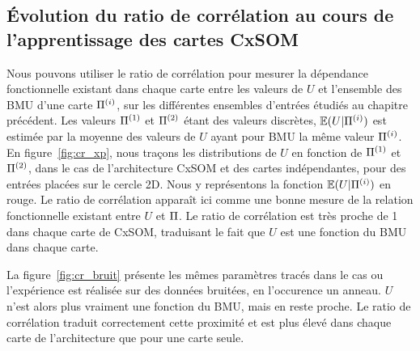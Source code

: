 \documentclass[../main]{subfiles}
\begin{document}
\subsection{\'Evolution du ratio de corrélation au cours de l'apprentissage des cartes CxSOM}

Nous pouvons utiliser le ratio de corrélation pour mesurer la dépendance fonctionnelle existant dans chaque carte entre les valeurs de $U$ et l'ensemble des BMU d'une carte $\Pi^{({i})}$, sur les différentes ensembles d'entrées étudiés au chapitre précédent.
Les valeurs $\Pi^{({1})}$ et $\Pi^{({2})}$ étant des valeurs discrètes, $\mathbb{E}(U|\Pi^{({i})})$ est estimée par la moyenne des valeurs de $U$ ayant pour BMU la même valeur $\Pi^{({i})}$. 
En figure~\ref{fig:cr_xp}, nous traçons les distributions de $U$ en fonction de $\Pi^{({1})}$ et $\Pi^{({2})}$, dans le cas de l'architecture CxSOM et des cartes indépendantes, pour des entrées placées sur le cercle 2D. Nous y représentons la fonction $\mathbb{E}(U|\Pi^{({i})})$ en rouge.
Le ratio de corrélation apparaît ici comme une bonne mesure de la relation fonctionnelle existant entre $U$ et $\Pi$. Le ratio de corrélation est très proche de 1 dans chaque carte de CxSOM, traduisant le fait que $U$ est une fonction du BMU dans chaque carte.

La figure~\ref{fig:cr_bruit} présente les mêmes paramètres tracés dans le cas ou l'expérience est réalisée sur des données bruitées, en l'occurence un anneau. $U$ n'est alors plus vraiment une fonction du BMU, mais en reste proche. 
Le ratio de corrélation traduit correctement cette proximité et est plus élevé dans chaque carte de l'architecture que pour une carte seule.
\end{document}
